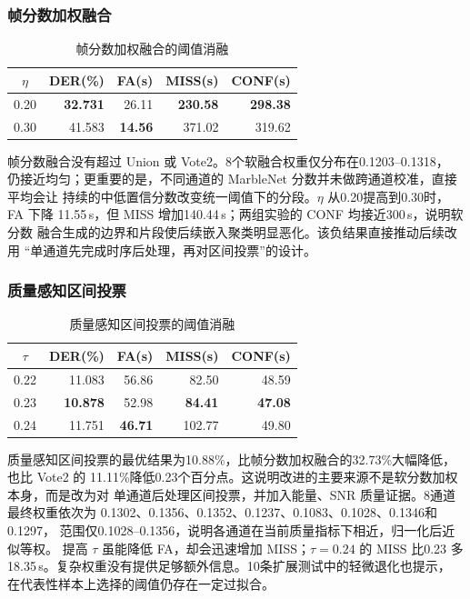 \documentclass[UTF8,a4paper,10pt]{ctexart}
\begin{document}
\subsubsection{帧分数加权融合}

\begin{table}[H]
\centering
\caption{帧分数加权融合的阈值消融}
\label{tab:frameweighted}
\begin{tabular}{crrrr}
\toprule
$\eta$ & DER(\%) & FA(s)& MISS(s)& CONF(s)\\
\midrule
0.20 & \textbf{32.731} & 26.11 & \textbf{230.58} & \textbf{298.38}\\
0.30 & 41.583 & \textbf{14.56} & 371.02 & 319.62\\
\bottomrule
\end{tabular}
\end{table}

帧分数融合没有超过 Union 或 Vote2。8个软融合权重仅分布在0.1203--0.1318，
仍接近均匀；更重要的是，不同通道的 MarbleNet 分数并未做跨通道校准，直接平均会让
持续的中低置信分数改变统一阈值下的分段。$\eta$ 从0.20提高到0.30时，FA 下降
11.55\,s，但 MISS 增加140.44\,s；两组实验的 CONF 均接近300\,s，说明软分数
融合生成的边界和片段使后续嵌入聚类明显恶化。该负结果直接推动后续改用
“单通道先完成时序后处理，再对区间投票”的设计。

\subsubsection{质量感知区间投票}

\begin{table}[H]
\centering
\caption{质量感知区间投票的阈值消融}
\label{tab:weighted}
\begin{tabular}{crrrr}
\toprule
$\tau$ & DER(\%) & FA(s)& MISS(s)& CONF(s)\\
\midrule
0.22 & 11.083 & 56.86 & 82.50 & 48.59\\
0.23 & \textbf{10.878} & 52.98 & \textbf{84.41} & \textbf{47.08}\\
0.24 & 11.751 & \textbf{46.71} & 102.77 & 49.80\\
\bottomrule
\end{tabular}
\end{table}

质量感知区间投票的最优结果为10.88\%，比帧分数加权融合的32.73\%大幅降低，也比 Vote2 的
11.11\%降低0.23个百分点。这说明改进的主要来源不是软分数加权本身，而是改为对
单通道后处理区间投票，并加入能量、SNR 质量证据。8通道最终权重依次为
0.1302、0.1356、0.1352、0.1237、0.1083、0.1028、0.1346和0.1297，
范围仅0.1028--0.1356，说明各通道在当前质量指标下相近，归一化后近似等权。
提高 $\tau$ 虽能降低 FA，却会迅速增加 MISS；$\tau=0.24$ 的 MISS 比0.23
多18.35\,s。复杂权重没有提供足够额外信息。10条扩展测试中的轻微退化也提示，
在代表性样本上选择的阈值仍存在一定过拟合。
\end{document}

